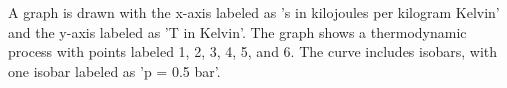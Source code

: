 A graph is drawn with the x-axis labeled as 's in kilojoules per kilogram Kelvin' and the y-axis labeled as 'T in Kelvin'. The graph shows a thermodynamic process with points labeled 1, 2, 3, 4, 5, and 6. The curve includes isobars, with one isobar labeled as 'p = 0.5 bar'.